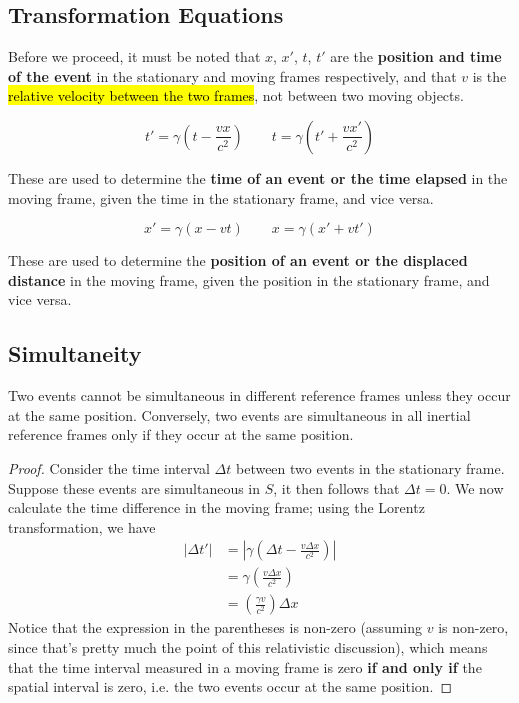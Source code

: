 \documentclass[a4paper,12pt]{article}
\newcommand{\paren}[1]{\left(#1\right)}
\begin{document}
\subsection{Transformation Equations}
Before we proceed, it must be noted that $x$, $x'$, $t$, $t'$ are the \textbf{position and time of the event} in the stationary and moving frames respectively, and that $v$ is the \hl{relative velocity between the two frames}, not between two moving objects.

\begin{equation}
  t' = \gamma \paren{t - \frac{vx}{c^2}} \quad \quad t = \gamma \paren{t' + \frac{vx'}{c^2}}
\end{equation}

These are used to determine the \textbf{time of an event or the time elapsed} in the moving frame, given the time in the stationary frame, and vice versa.

\begin{equation}
  x' = \gamma \paren{x - vt} \quad \quad x = \gamma \paren{x' + vt'}
\end{equation}

These are used to determine the \textbf{position of an event or the displaced distance} in the moving frame, given the position in the stationary frame, and vice versa.

\pagebreak

\subsection{Simultaneity}

\begin{prop}
  Two events cannot be simultaneous in different reference frames unless they occur at the same position. Conversely, two events are simultaneous in all inertial reference frames only if they occur at the same position.
  \begin{proof}
    Consider the time interval $\Delta t$ between two events in the stationary frame. Suppose these events are simultaneous in $S$, it then follows that $\Delta t = 0$. We now calculate the time difference in the moving frame; using the Lorentz transformation, we have
    \begin{align*}
      \lvert\Delta t'\rvert & = \left|\gamma\paren{\Delta t - \frac{v\Delta x}{c^2}}\right| \\
                            & = \gamma\paren{\frac{v\Delta x}{c^2}}                         \\
                            & = \paren{\frac{\gamma v}{c^2}}\Delta x
    \end{align*}
    Notice that the expression in the parentheses is non-zero (assuming $v$ is non-zero, since that's pretty much the point of this relativistic discussion), which means that the time interval measured in a moving frame is zero \textbf{if and only if} the spatial interval is zero, i.e. the two events occur at the same position.
  \end{proof}
\end{prop}
\end{document}

